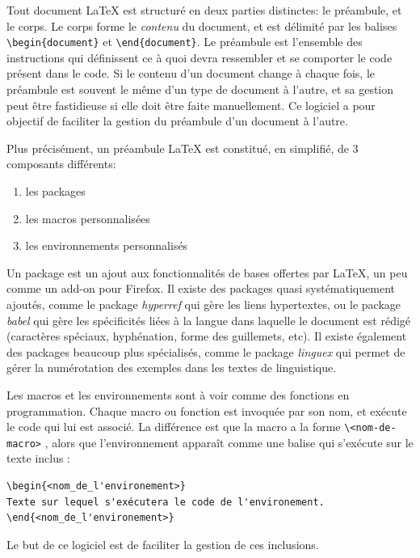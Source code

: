 \documentclass[a4paper, oneside]{article}
\begin{document}
Tout document \LaTeX{} est structuré en deux parties distinctes: le préambule,
et le corps. Le corps forme le \emph{contenu} du document, et est délimité par les
balises \texttt{\textbackslash{}begin\{document\}} et \texttt{\textbackslash{}end\{document\}}.  Le préambule est l'ensemble des
instructions qui définissent ce à quoi devra ressembler et se comporter le code
présent dans le code. Si le contenu d'un document change à chaque fois, le
préambule est souvent le même d'un type de document à l'autre, et sa gestion peut
être fastidieuse si elle doit être faite manuellement. Ce logiciel a pour
objectif de faciliter la gestion du préambule d'un document à l'autre.

Plus précisément, un préambule \LaTeX{} est constitué, en simplifié, de 3
composants différents:

\begin{enumerate}
\item les packages
\item les macros personnalisées
\item les environnements personnalisés
\end{enumerate}

Un package est un ajout aux fonctionnalités de bases offertes par \LaTeX{}, un
peu comme un add-on pour Firefox. Il existe des packages quasi systématiquement
ajoutés, comme le package \emph{hyperref} qui gère les liens hypertextes, ou le
package \emph{babel} qui gère les spécificités liées à la langue dans laquelle le
document est rédigé (caractères spéciaux, hyphénation, forme des guillemets,
etc). Il existe également des packages beaucoup plus spécialisés, comme le
package \emph{linguex} qui permet de gérer la numérotation des exemples dans les
textes de linguistique.

Les macros et les environnements sont à voir comme des fonctions en
programmation. Chaque macro ou fonction est invoquée par son nom, et exécute le
code qui lui est associé. La différence est que la macro a la forme \texttt{\textbackslash{}<nom-de-macro>}
, alors que l'environnement apparaît comme une balise qui
s'exécute sur le texte inclus :

\begin{verbatim}
\begin{<nom_de_l'environement>}
Texte sur lequel s'exécutera le code de l'environement.
\end{<nom_de_l'environement>}
\end{verbatim}

Le but de ce logiciel est de faciliter la gestion de ces inclusions.
\end{document}
